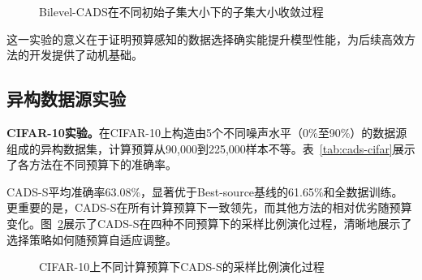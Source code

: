 \begin{figure}[htb]
  \centering
  \caption{Bilevel-CADS在不同初始子集大小下的子集大小收敛过程}
  \label{fig:cads-convergence}
\end{figure}

这一实验的意义在于证明预算感知的数据选择确实能提升模型性能，为后续高效方法的开发提供了动机基础。

\subsection{异构数据源实验}

\textbf{CIFAR-10实验。}在CIFAR-10上构造由5个不同噪声水平（0\%至90\%）的数据源组成的异构数据集，计算预算从90,000到225,000样本不等。表~\ref{tab:cads-cifar}展示了各方法在不同预算下的准确率。

\begin{table}[htb]
  \centering
  \caption{CIFAR-10异构数据源实验——不同计算预算下各方法的准确率对比}
  \label{tab:cads-cifar}
\end{table}

CADS-S平均准确率63.08\%，显著优于Best-source基线的61.65\%和全数据训练。%
更重要的是，CADS-S在所有计算预算下一致领先，而其他方法的相对优劣随预算变化。图~\ref{fig:cads-cifar-ratio}展示了CADS-S在四种不同预算下的采样比例演化过程，清晰地展示了选择策略如何随预算自适应调整。

\begin{figure}[htb]
  \centering
  \caption{CIFAR-10上不同计算预算下CADS-S的采样比例演化过程}
  \label{fig:cads-cifar-ratio}
\end{figure}

